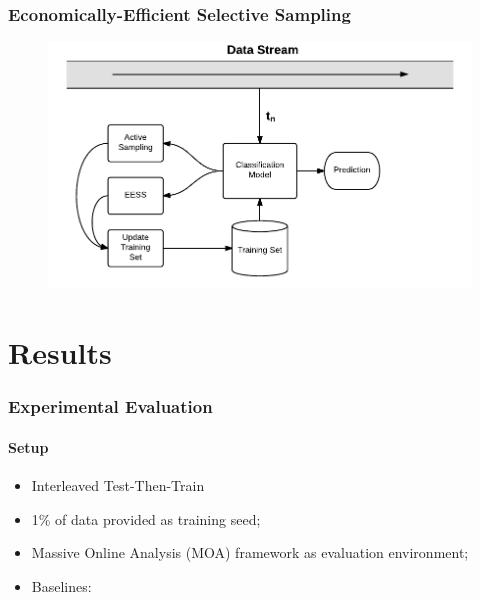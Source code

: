 \documentclass[14pt]{beamer}
\begin{document}
\begin{frame}\frametitle{Economically-Efficient Selective Sampling}
\begin{figure}
\centering
\includegraphics[scale=0.7]{EESS}
\end{figure}
\end{frame}

\section{Results}
\begin{frame}
\frametitle{Experimental Evaluation}
\framesubtitle{Setup}
\begin{itemize}
    \item Interleaved Test-Then-Train
    \item 1\% of data provided as training seed;
    \item Massive Online Analysis (MOA) framework as evaluation environment;
    \item Baselines:
\begin{table}
\centering
{}
\end{table}
\end{itemize}


\end{frame}
\end{document}
